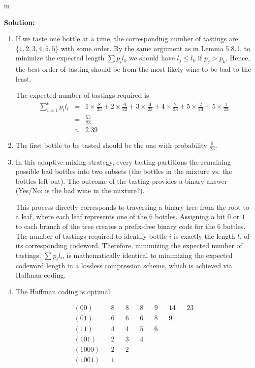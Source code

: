 \documentclass[12pt]{article}
\begin{document}
\begin{enumerate}
 in
\begin{solution}
{\bf Solution: }\\
\begin{enumerate}
\item
If we taste one bottle at a time, the corresponding number of tastings are $\{1,2,3,4,5,5\}$ with some order. By the same argument as in Lemma 5.8.1, to minimize the expected length $\sum p_i l_k$ we should have $l_j \le l_k$ if $p_j > p_k$.  Hence, the best order of tasting should be from the most likely wine to be bad to the least. 

The expected number of tastings required is 
\begin{eqnarray*}
  \sum_{i=1}^{6}p_{i}l_{i} & = & 1 \times \frac{8}{23} + 
           2 \times \frac{6}{23} + 3 \times \frac{4}{23} +
           4 \times \frac{2}{23} + 5 \times \frac{2}{23} +
           5 \times \frac{1}{23} \\
                           & = & \frac{55}{23} \\
                           & \approx & 2.39
\end{eqnarray*}

\item   The first bottle to be tasted should be the one with probability $\frac{8}{23}$.

\item  In this adaptive mixing strategy, every tasting partitions the remaining possible bad bottles into two subsets (the bottles in the mixture vs. the bottles left out). The outcome of the tasting provides a binary answer (Yes/No: is the bad wine in the mixture?). 

This process directly corresponds to traversing a binary tree from the root to a leaf, where each leaf represents one of the 6 bottles. Assigning a bit $0$ or $1$ to each branch of the tree creates a prefix-free binary code for the 6 bottles. The number of tastings required to identify bottle $i$ is exactly the length $l_i$ of its corresponding codeword. Therefore, minimizing the expected number of tastings, $\sum p_i l_i$, is mathematically identical to minimizing the expected codeword length in a lossless compression scheme, which is achieved via Huffman coding.

\item   The Huffman coding is optimal.
\begin{center}
\[
\begin{array}{lllllllllllll}
(00)   && 8 && 8 && 8 && 9 && 14 && 23\\
(01)   && 6 && 6 && 6 && 8 && 9 \\
(11)   && 4 && 4 && 5 && 6\\
(101)  && 2 && 3 && 4 \\
(1000) && 2 && 2 \\
(1001) && 1 && 
\end{array}
\]
\end{center}


\end{enumerate}
\end{solution}
\end{enumerate}
\end{document}
